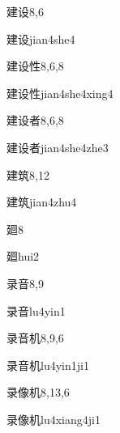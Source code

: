 \begin{entry}{建设}{8,6}
  \begin{phonetics}{建设}{jian4she4}
  \end{phonetics}
\end{entry}

\begin{entry}{建设性}{8,6,8}
  \begin{phonetics}{建设性}{jian4she4xing4}
  \end{phonetics}
\end{entry}

\begin{entry}{建设者}{8,6,8}
  \begin{phonetics}{建设者}{jian4she4zhe3}
  \end{phonetics}
\end{entry}

\begin{entry}{建筑}{8,12}
  \begin{phonetics}{建筑}{jian4zhu4}
  \end{phonetics}
\end{entry}

\begin{entry}{廻}{8}
  \begin{phonetics}{廻}{hui2}
  \end{phonetics}
\end{entry}

\begin{entry}{录音}{8,9}
  \begin{phonetics}{录音}{lu4yin1}
  \end{phonetics}
\end{entry}

\begin{entry}{录音机}{8,9,6}
  \begin{phonetics}{录音机}{lu4yin1ji1}
  \end{phonetics}
\end{entry}

\begin{entry}{录像机}{8,13,6}
  \begin{phonetics}{录像机}{lu4xiang4ji1}
  \end{phonetics}
\end{entry}

